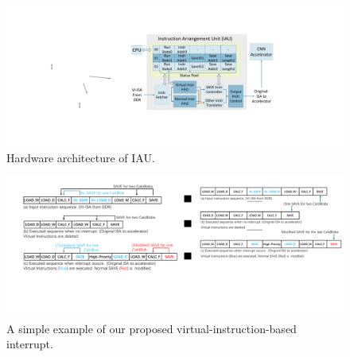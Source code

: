 \begin{figure}[t]
	\centering
	\includegraphics[width=0.9\linewidth]{fig/iau.pdf}
	\caption{Hardware architecture of IAU. 
	}
	\label{fig:IAU}
\end{figure}

\begin{figure}[t]
	\centering
	\includegraphics[width=0.9\linewidth]{fig/interexample.pdf}
	\caption{ A simple example of our proposed virtual-instruction-based interrupt. }
	\label{fig:interexample}
\end{figure}

